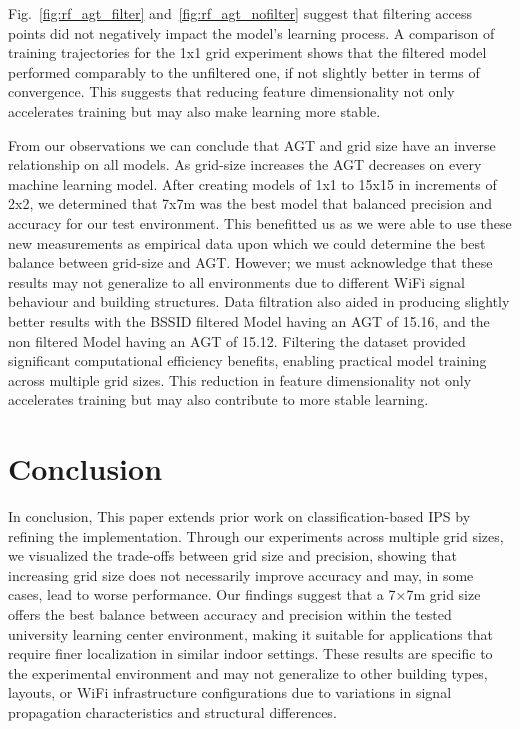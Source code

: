 \documentclass[runningheads]{llncs}
\begin{document}
Fig.~\ref{fig:rf_agt_filter} and~\ref{fig:rf_agt_nofilter} suggest that filtering access points did not negatively impact the model's learning process. A comparison of training trajectories for the 1x1 grid experiment shows that the filtered model performed comparably to the unfiltered one, if not slightly better in terms of convergence. This suggests that reducing feature dimensionality not only accelerates training but may also make learning more stable.

From our observations we can conclude that AGT and grid size have an inverse relationship on all models. As grid-size increases the AGT decreases on every machine learning model. After creating models of 1x1 to 15x15 in increments of 2x2, we determined that 7x7m was the best model that balanced precision and accuracy for our test environment. This benefitted us as we were able to use these new measurements as empirical data upon which we could determine the best balance between grid-size and AGT. However; we must acknowledge that these results may not generalize to all environments due to different WiFi signal behaviour and building structures. Data filtration also aided in producing slightly better results with the BSSID filtered Model having an AGT of 15.16, and the non filtered Model having an AGT of 15.12. Filtering the dataset provided significant computational efficiency benefits, enabling practical model training across multiple grid sizes. This reduction in feature dimensionality not only accelerates training but may also contribute to more stable learning.





\section{Conclusion}
In conclusion, This paper extends prior work on classification-based IPS \cite{LRE1} by refining the implementation. Through our experiments across multiple grid sizes, we visualized the trade-offs between grid size and precision, showing that increasing grid size does not necessarily improve accuracy and may, in some cases, lead to worse performance. Our findings suggest that a 7×7m grid size offers the best balance between accuracy and precision within the tested university learning center environment, making it suitable for applications that require finer localization in similar indoor settings. These results are specific to the experimental environment and may not generalize to other building types, layouts, or WiFi infrastructure configurations due to variations in signal propagation characteristics and structural differences.
\end{document}
